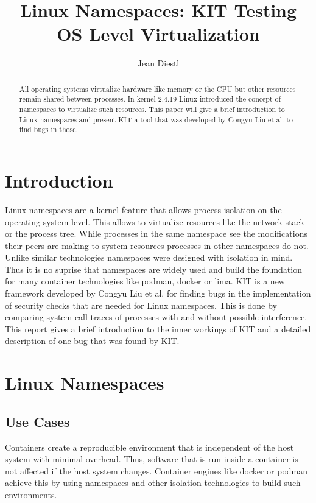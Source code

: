 \documentclass[10pt,twocolumn,a4paper]{article}
\author{Jean Diestl}
\begin{document}
\title{Linux Namespaces: KIT Testing OS Level Virtualization}

\newcommand{\todo}[1]{{\texttt{[#1]}}}
\newcommand{\code}[1]{{\tt \small{#1}}}

\maketitle
\lstset{language=C, basicstyle=\ttfamily,
        columns=fullflexible,
        string=[b]', showspaces=false, showtabs=false,
         captionpos=b,
        framerule=1pt,
        breaklines=true, breakatwhitespace=true,
        autogobble=true}


\begin{abstract}
All operating systems virtualize hardware like memory or the CPU but other resources remain shared between processes.
In kernel 2.4.19 Linux introduced the concept of namespaces to virtualize such resources. This paper will give a brief 
introduction to Linux namespaces and present KIT a tool that was developed by Congyu Liu et al. to
find bugs in those.
\end{abstract}

\section{Introduction}\label{sec:introduction}
Linux namespaces are a kernel feature that allows process isolation on the operating system level.
This allows to virtualize resources like the network stack or the process tree.
While processes in the same namespace see the modifications their peers are making to system resources
processes in other namespaces do not. Unlike similar technologies namespaces were designed with
isolation in mind. Thus it is no suprise that namespaces are widely used and build the foundation
for many container technologies like podman, docker or lima.
KIT is a new framework developed by Congyu Liu et al. for finding bugs in the implementation of
security checks that are needed for Linux namespaces\cite{0}. 
This is done by comparing system call traces of processes with and without possible interference.
This report gives a brief introduction to the inner
workings of KIT and a detailed description of one bug
that was found by KIT. 

\section{Linux Namespaces}
\subsection{Use Cases}
Containers create a reproducible environment that is independent of the host system with minimal overhead.
Thus, software that is run inside a container is not affected if the host system changes. 
Container engines like docker or podman achieve this by using namespaces and other isolation
technologies to build such environments.
\end{document}
